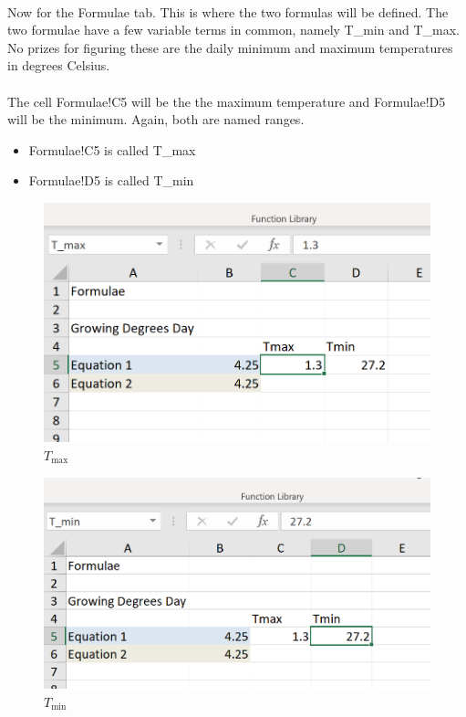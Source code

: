 \documentclass[12pt,a4paper,twoside,openright,titlepage]{article}
\begin{document}
\paragraph{} Now for the Formulae tab. This is where the two formulas will be defined. The two formulae have a few variable terms in common, namely T\_min and T\_max. No prizes for figuring these are the daily minimum and maximum temperatures in degrees Celsius.

\paragraph{} The cell Formulae!C5 will be the the maximum temperature and Formulae!D5 will be the minimum. Again, both are named ranges.

\begin{itemize}
	\item Formulae!C5 is called T\_max 
	\item Formulae!D5 is called T\_min 
\end{itemize}

\begin{figure}[h!]
	\centering
	\includegraphics[scale=0.9]{images/t_max.PNG}
	\caption{$T_{\textrm{max}}$}
\end{figure}

\begin{figure}[h!]
	\centering
	\includegraphics[scale=0.9]{images/t_min.PNG}
	\caption{$T_{\textrm{min}}$}
\end{figure}
\end{document}
